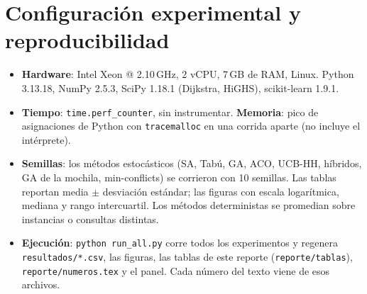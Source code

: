 \documentclass[11pt]{article}
\theoremstyle{remark}
\begin{document}
\section{Configuración experimental y reproducibilidad}
\begin{itemize}
\item \textbf{Hardware}: Intel Xeon @ 2.10\,GHz, 2 vCPU, 7\,GB de RAM, Linux. Python 3.13.18,
NumPy 2.5.3, SciPy 1.18.1 (Dijkstra, HiGHS), scikit-learn 1.9.1.
\item \textbf{Tiempo}: \texttt{time.perf\_counter}, sin instrumentar. \textbf{Memoria}: pico de
asignaciones de Python con \texttt{tracemalloc} en una corrida aparte (no incluye el intérprete).
\item \textbf{Semillas}: los métodos estocásticos (SA, Tabú, GA, ACO, UCB-HH, híbridos, GA de la
mochila, min-conflicts) se corrieron con 10 semillas. Las tablas reportan media $\pm$ desviación
estándar; las figuras con escala logarítmica, mediana y rango intercuartil. Los métodos deterministas
se promedian sobre instancias o consultas distintas.
\item \textbf{Ejecución}: \texttt{python run\_all.py} corre todos los experimentos y regenera
\texttt{resultados/*.csv}, las figuras, las tablas de este reporte (\texttt{reporte/tablas}),
\texttt{reporte/numeros.tex} y el panel. Cada número del texto viene de esos archivos.
\end{itemize}
\end{document}
